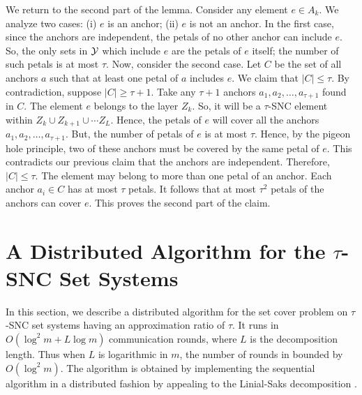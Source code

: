 \documentclass[11pt]{article}
\newcommand{\calY} {{\cal Y}}
\begin{document}
We return to the second part of the lemma.
Consider any element $e\in A_k$. We analyze two cases: (i) $e$ is an anchor;
(ii) $e$ is not an anchor. In the first case, since the anchors are independent,
the petals of no other anchor can include $e$. So, the only sets in $\calY$
which include $e$ are the petals of $e$ itself; the number of such petals is at most $\tau$.
Now, consider the second case. Let $C$ be the set of all anchors $a$ such that
at least one petal of $a$ includes $e$. We claim that $|C|\leq \tau$.
By contradiction, suppose $|C|\geq \tau+1$.
Take any $\tau+1$ anchors $a_1, a_2, \ldots, a_{\tau+1}$ found in $C$.
The element $e$ belongs to the layer $Z_k$. So, it will be a $\tau$-SNC element within
$Z_k\cup Z_{k+1}\cup \cdots Z_L$. 
Hence, the petals of $e$ will cover all the anchors $a_1, a_2, \ldots, a_{\tau+1}$.
But, the number of petals of $e$ is at most $\tau$.
Hence, by the pigeon hole principle, two of these anchors must be covered by the 
same petal of $e$. This contradicts our previous claim that the anchors are independent.
Therefore, $|C|\leq \tau$. The element may belong to more than one petal of an anchor.
Each anchor $a_i\in C$ has at most $\tau$ petals. 
It follows that at most $\tau^2$ petals of the anchors can cover $e$.
This proves the second part of the claim.

\section{A Distributed Algorithm for the $\tau$-SNC Set Systems}
In this section, we describe a distributed algorithm for the set cover problem on $\tau$-SNC set systems
having an approximation ratio of $\tau$. It runs in $O(\log^2 m + L \log m)$
communication rounds, where $L$ is the decomposition length.
Thus when $L$ is logarithmic in $m$, the number of rounds in bounded by $O(\log^2 m)$.
The algorithm is obtained by implementing the sequential algorithm in a distributed fashion by appealing to the Linial-Saks decomposition \cite{LS}.
\end{document}
